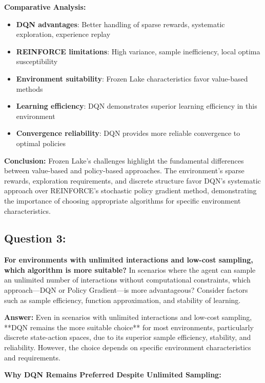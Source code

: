 \documentclass[12pt]{article}
\begin{document}
{{{\textbf{Comparative Analysis:}
\begin{itemize}
    \item \textbf{DQN advantages}: Better handling of sparse rewards, systematic exploration, experience replay
    \item \textbf{REINFORCE limitations}: High variance, sample inefficiency, local optima susceptibility
    \item \textbf{Environment suitability}: Frozen Lake characteristics favor value-based methods
    \item \textbf{Learning efficiency}: DQN demonstrates superior learning efficiency in this environment
    \item \textbf{Convergence reliability}: DQN provides more reliable convergence to optimal policies
\end{itemize}

\textbf{Conclusion:}
Frozen Lake's challenges highlight the fundamental differences between value-based and policy-based approaches. The environment's sparse rewards, exploration requirements, and discrete structure favor DQN's systematic approach over REINFORCE's stochastic policy gradient method, demonstrating the importance of choosing appropriate algorithms for specific environment characteristics.

\subsection{Question 3:}
\textbf{For environments with unlimited interactions and low-cost sampling, which algorithm is more suitable?}
\newline
In scenarios where the agent can sample an unlimited number of interactions without computational constraints, which approach—DQN or Policy Gradient—is more advantageous? Consider factors such as sample efficiency, function approximation, and stability of learning.

\textbf{Answer:} Even in scenarios with unlimited interactions and low-cost sampling, **DQN remains the more suitable choice** for most environments, particularly discrete state-action spaces, due to its superior sample efficiency, stability, and reliability. However, the choice depends on specific environment characteristics and requirements.

\textbf{Why DQN Remains Preferred Despite Unlimited Sampling:}

}}}
\end{document}
